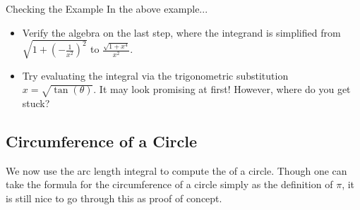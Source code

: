 \begin{exercise}{Checking the Example \Coffeecup}
In the above example...
\begin{itemize}
\item Verify the algebra on the last step, where the integrand is simplified from $\sqrt{1+\left( -\frac{1}{x^2}\right)^2 }$ to $\frac{\sqrt{1+x^4}}{x^2}$. 


\item Try evaluating the integral via the trigonometric substitution $x=\sqrt{\tan\left(\theta\right)}$.  It may look promising at first!  However, where do you get stuck?


\end{itemize}
\end{exercise}
\subsection{Circumference of a Circle }
We now use the arc length integral to compute the  of a circle.  Though one can take the formula for the circumference of a circle simply as the definition of $\pi$, it is still nice to go through this as proof of concept.  

